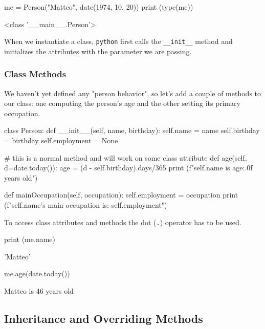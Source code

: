 \begin{ipythonnon}
me = Person("Matteo", date(1974, 10, 20))
print (type(me))
\end{ipythonnon}
\begin{ioutput}
<class '\_\_main\_\_.Person'>
\end{ioutput}

When we instantiate a class, \texttt{python} first calls the \texttt{\_\_init\_\_} method and initializes the attributes with the parameter we are passing.

\subsubsection{Class Methods}

We haven't yet defined any "person behavior", so let's add a couple of methods to our class: one computing the person's age and the other setting its primary occupation.

\begin{ipythonnon}
class Person:
    def __init__(self, name, birthday):
        self.name = name
        self.birthday = birthday
        self.employment = None

    # this is a normal method and will work on some class attribute
    def age(self, d=date.today()):
        age = (d - self.birthday).days/365
        print (f"{self.name} is {age:.0f} years old")

    def mainOccupation(self, occupation):
        self.employment = occupation
        print (f"{self.name}'s main occupation is: {self.employment}")
\end{ipythonnon}

To access class attributes and methods the dot (\texttt{.}) operator has to be used. 

\begin{ipythonnon}
print (me.name)
\end{ipythonnon}
\begin{ioutput}
'Matteo'
\end{ioutput}
        
\begin{ipythonnon}
me.age(date.today())
\end{ipythonnon}
\begin{ioutput}
Matteo is 46 years old
\end{ioutput}

\subsection{Inheritance and Overriding Methods}
\label{inheritance-and-overriding-methods}

